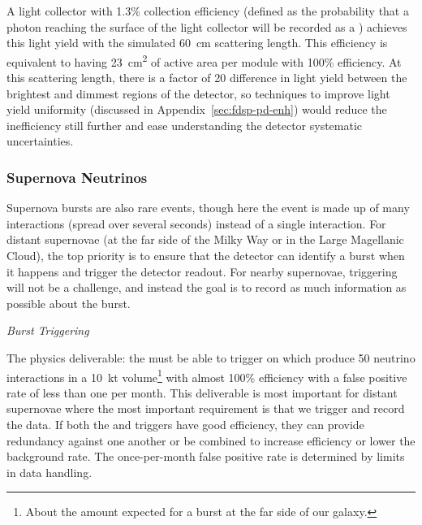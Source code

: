 A light collector with 1.3\% collection efficiency (defined as the probability that a photon reaching the surface of the light collector will be recorded as a \phel) achieves this light yield with the simulated \SI{60}{cm} scattering length. This efficiency is equivalent to having \SI{23}{cm^2} of active area per module with 100\% efficiency. At this scattering length, there is a factor of 20 difference in light yield between the brightest and dimmest regions of the detector, so techniques to improve light yield uniformity (discussed in Appendix~\ref{sec:fdsp-pd-enh}) would reduce the inefficiency still further and ease understanding the detector systematic uncertainties.


\subsubsection{Supernova Neutrinos}
\label{subsec:fdsp-pd-simphys-snb}

Supernova bursts are also rare events, though here the event is made up of many interactions (spread over several seconds) instead of a single interaction. For distant supernovae (at the far side of the Milky Way or in the Large Magellanic Cloud), the top priority is to ensure that the detector can identify a burst when it happens and trigger the detector readout. For nearby supernovae, triggering will not be a challenge, and instead the goal is to record as much information as possible about the burst.

\textit{Burst Triggering}\nopagebreak

The physics deliverable: the  must be able to trigger on  which produce 50 neutrino interactions in a \SI{10}{kt} volume\footnote{About the amount expected for a burst at the far side of our galaxy.} with almost 100\% efficiency with a false positive rate of less than one per month. This deliverable is most important for distant supernovae where the most important requirement is that we trigger and record the data. If both the  and  triggers have good efficiency, they can provide redundancy against one another or be combined to increase efficiency or lower the background rate. The once-per-month false positive rate is determined by limits in data handling.

